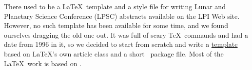 \documentclass[twoside]{article}
\begin{document}








There used to be a \LaTeX\ template and a style file for writing
Lunar and Planetary Science Conference (LPSC) abstracts available
on the LPI Web site.  However, no such template has been available
for some time, and we found ourselves dragging the old one out.  It
was full of scary \TeX\ commands and had a date from 1996 in it,
so we decided to start from scratch and write a
\href{https://github.com/rbeyer/lpsc_template}{template} based
on \LaTeX's own article class and a short \LaTeXe\ package file.
Most of the \LaTeX\ work is based on \citet{latexguide}.
\end{document}
